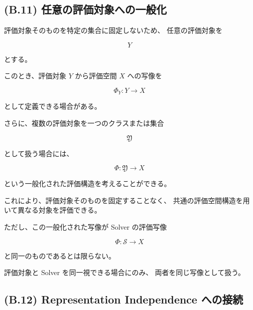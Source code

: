 \documentclass[a4paper,11pt]{article}
\newcommand{\Solver}{\mathcal{S}}
\begin{document}
\subsection{(B.11) 任意の評価対象への一般化}
\label{subsec:B11}

評価対象そのものを特定の集合に固定しないため、
任意の評価対象を

\begin{equation}
    Y
\end{equation}

とする。

このとき、評価対象 $Y$ から評価空間 $X$ への写像を

\begin{equation}
    \Phi_Y:
    Y
    \longrightarrow
    X
    \label{eq:B-object-evaluation}
\end{equation}

として定義できる場合がある。

さらに、複数の評価対象を一つのクラスまたは集合

\begin{equation}
    \mathfrak{Y}
\end{equation}

として扱う場合には、

\begin{equation}
    \Phi:
    \mathfrak{Y}
    \longrightarrow
    X
    \label{eq:B-general-object-evaluation}
\end{equation}

という一般化された評価構造を考えることができる。

これにより、評価対象そのものを固定することなく、
共通の評価空間構造を用いて異なる対象を評価できる。

ただし、この一般化された写像が Solver の評価写像

\begin{equation}
    \Phi:\Solver\to X
\end{equation}

と同一のものであるとは限らない。

評価対象と Solver を同一視できる場合にのみ、
両者を同じ写像として扱う。


\subsection{(B.12) Representation Independence への接続}
\label{subsec:B12}
\end{document}
